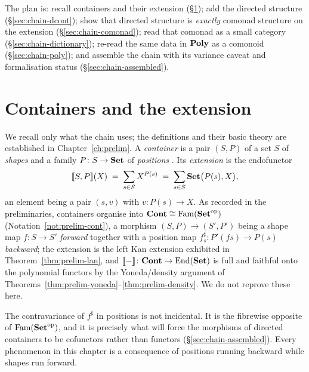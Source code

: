 The plan is: recall containers and their extension (\S\ref{sec:chain-cont});
add the directed structure (\S\ref{sec:chain-dcont}); show that directed
structure is \emph{exactly} comonad structure on the extension
(\S\ref{sec:chain-comonad}); read that comonad as a small category
(\S\ref{sec:chain-dictionary}); re-read the same data in $\mathbf{Poly}$ as a comonoid
(\S\ref{sec:chain-poly}); and assemble the chain with its variance caveat and
formalisation status (\S\ref{sec:chain-assembled}).

\section{Containers and the extension}\label{sec:chain-cont}

We recall only what the chain uses; the definitions and their basic theory are
established in Chapter~\ref{ch:prelim}. A \emph{container} is a pair $(S,P)$ of
a set $S$ of \emph{shapes} and a family $P\colon S\to\mathbf{Set}$ of \emph{positions}
\cite{AAG}. Its \emph{extension} is the endofunctor
\[
  \llbracket S,P \rrbracket(X)\;=\;\sum_{s\in S}X^{P(s)}\;=\;\sum_{s\in S}\mathbf{Set}\big(P(s),X\big),
\]
an element being a pair $(s,v)$ with $v\colon P(s)\to X$. As recorded in the
preliminaries, containers organise into $\mathbf{Cont}\cong\mathrm{Fam}(\mathbf{Set}^{\mathrm{op}})$
(Notation~\ref{not:prelim-cont}), a morphism $(S,P)\to(S',P')$ being a shape map
$f\colon S\to S'$ \emph{forward} together with a position map
$f^{\sharp}_{s}\colon P'(fs)\to P(s)$ \emph{backward}; the extension is the left
Kan extension exhibited in Theorem~\ref{thm:prelim-lan}, and
$\llbracket - \rrbracket\colon\mathbf{Cont}\to\mathrm{End}(\mathbf{Set})$ is full and faithful onto the polynomial
functors by the Yoneda/density argument of
Theorems~\ref{thm:prelim-yoneda}--\ref{thm:prelim-density}. We do not reprove
these here.

\begin{remark}\label{rem:chain-variance}
The contravariance of $f^{\sharp}$ in positions is not incidental. It is the
fibrewise opposite of $\mathrm{Fam}(\mathbf{Set}^{\mathrm{op}})$, and it is precisely what will force the
morphisms of directed containers to be cofunctors rather than functors
(\S\ref{sec:chain-assembled}). Every phenomenon in this chapter is a consequence
of positions running backward while shapes run forward.
\end{remark}

